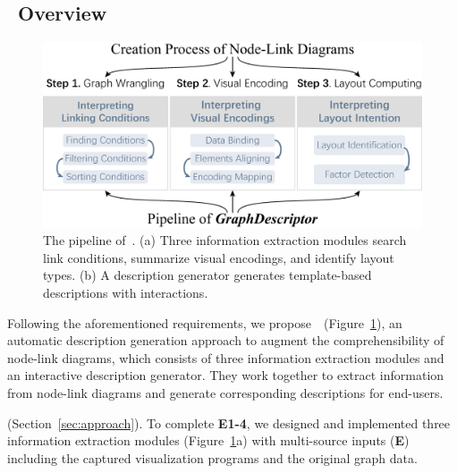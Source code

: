 \subsection{\ApproachName~Overview} \label{sec:overview}

\begin{figure}[t]
    \centering
    \includegraphics[width=2\columnwidth]{figures/workflow.eps}
    \caption{The pipeline of~\ApproachName. (a) Three information extraction modules search link conditions, summarize visual encodings, and identify layout types. (b) A description generator generates template-based descriptions with interactions. 
    }
    \label{fig:workflow}
\end{figure}

Following the aforementioned requirements, we propose~\ApproachName~(Figure~\ref{fig:workflow}), an automatic description generation approach to augment the comprehensibility of node-link diagrams, which consists of three information extraction modules and an interactive description generator. They work together to extract information from node-link diagrams and generate corresponding descriptions for end-users.

  (Section~\ref{sec:approach}). To complete \textbf{E1-4}, we designed and implemented three information extraction modules (Figure~\ref{fig:workflow}a) with multi-source inputs (\textbf{E}) including the captured visualization programs and the original graph data.

